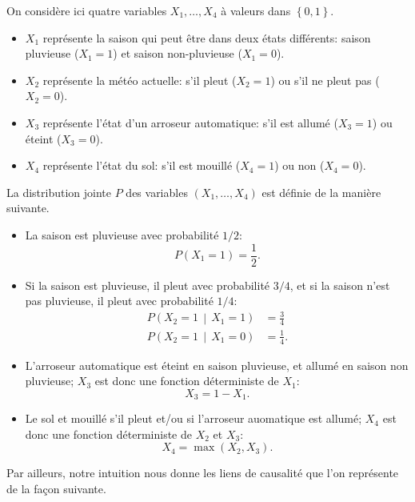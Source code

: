 On considère ici quatre variables \(X_1,\dots,X_4\) à valeurs dans \(\left\{ 0,1 \right\}\).
\begin{itemize}
\item \(X_1\) représente la saison qui peut être dans deux états différents: saison pluvieuse (\(X_1=1\)) et saison non-pluvieuse (\(X_1=0\)).
\item \(X_2\) représente la météo actuelle: s'il pleut (\(X_2=1\)) ou s'il ne pleut pas (\(X_2=0\)).
\item \(X_3\) représente l'état d'un arroseur automatique: s'il est allumé
(\(X_3=1\)) ou éteint (\(X_3=0\)).
\item \(X_4\) représente l'état du sol: s'il est mouillé (\(X_4=1\)) ou non (\(X_4=0\)).
\end{itemize}
La distribution jointe \(P\) des variables \((X_1,\dots,X_4)\) est définie
de la manière suivante.
\begin{itemize}
\item La saison est pluvieuse avec probabilité \(1/2\):
\[ P(X_1=1)=\frac{1}{2}.  \]
\item Si la saison est pluvieuse, il pleut avec probabilité \(3/4\), et si
la saison n'est pas pluvieuse, il pleut avec probabilité \(1/4\):
\begin{align*}
P\left( X_2=1\,\middle|\,X_1=1 \right)&=\frac{3}{4}\\
P\left( X_2=1\,\middle|\,X_1=0 \right)&=\frac{1}{4}.
\end{align*}
\item L'arroseur automatique est éteint en saison pluvieuse, et allumé en
saison non pluvieuse; \(X_3\) est donc une fonction déterministe de
\(X_1\):
\[ X_3=1-X_1. \]
\item Le sol et mouillé s'il pleut et/ou si l'arroseur auomatique est
allumé; \(X_4\) est donc une fonction déterministe de \(X_2\) et \(X_3\):
\[ X_4=\max_{}(X_2,X_3). \]
\end{itemize}
Par ailleurs, notre intuition nous donne les liens de causalité que
l'on représente de la façon suivante.
\begin{center}
\end{center}
